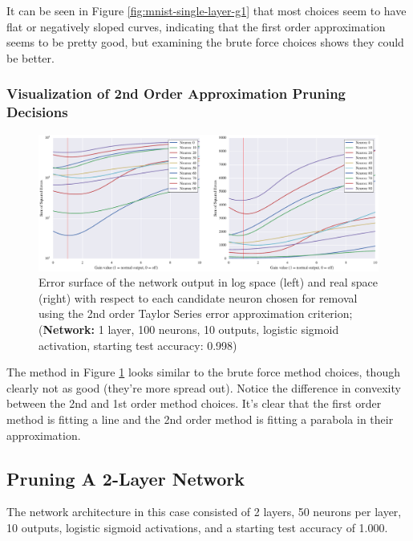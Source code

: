 It can be seen in Figure \ref{fig:mnist-single-layer-g1} that most choices seem to have flat or negatively sloped curves, indicating that the first order approximation seems to be pretty good, but examining the brute force choices shows they could be better. 

\subsubsection{Visualization of 2nd Order Approximation Pruning Decisions}
\begin{figure}[!ht]
\centering
\includegraphics[width=\linewidth]{png/mnist-acc99-g2-gain.pdf}
\caption{Error surface of the network output in log space (left) and real space (right) with respect to each candidate neuron chosen for removal using the 2nd order Taylor Series error approximation criterion; (\textbf{Network:} 1 layer, 100 neurons, 10 outputs, logistic sigmoid activation, starting test accuracy: 0.998)}
\label{fig:mnist-single-layer-g2}
\end{figure}

The method in Figure \ref{fig:mnist-single-layer-g2} looks similar to the brute force method choices, though clearly not as good (they're more spread out). Notice the difference in convexity between the 2nd and 1st order method choices. It's clear that the first order method is fitting a line and the 2nd order method is fitting a parabola in their approximation. 

\subsection{Pruning A 2-Layer Network}
The network architecture in this case consisted of 2 layers, 50 neurons per layer, 10 outputs, logistic sigmoid activations, and a starting test accuracy of 1.000.

